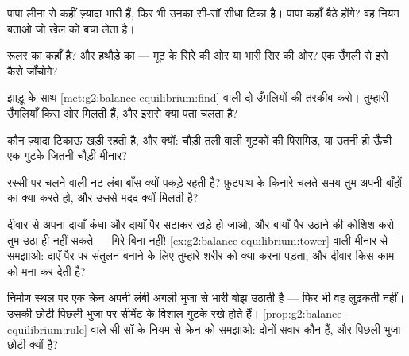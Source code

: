 \begin{exercise}[$\star$]\label{exo:g2:balance-equilibrium:4}
पापा लीना से कहीं ज़्यादा भारी हैं, फिर भी उनका सी-सॉ सीधा टिका है।
पापा कहाँ बैठे होंगे? वह नियम बताओ जो खेल को बचा लेता है।
\end{exercise}

\begin{exercise}[$\star$]\label{exo:g2:balance-equilibrium:5}
रूलर का  कहाँ है? और हथौड़े का --- मूठ के सिरे की ओर या
भारी सिर की ओर? एक उँगली से इसे कैसे जाँचोगे?
\end{exercise}

\begin{exercise}[$\star$]\label{exo:g2:balance-equilibrium:6}
झाड़ू के साथ \cref{met:g2:balance-equilibrium:find} वाली दो उँगलियों
की तरकीब करो। तुम्हारी उँगलियाँ किस ओर मिलती हैं, और इससे क्या पता
चलता है?
\end{exercise}

\begin{exercise}[$\star$]\label{exo:g2:balance-equilibrium:7}
कौन ज़्यादा टिकाऊ खड़ी रहती है, और क्यों: चौड़ी तली वाली गुटकों की
पिरामिड, या उतनी ही ऊँची एक गुटके जितनी चौड़ी मीनार?
\end{exercise}

\begin{exercise}[$\star$]\label{exo:g2:balance-equilibrium:8}
रस्सी पर चलने वाली नट लंबा बाँस क्यों पकड़े रहती है? फ़ुटपाथ के
किनारे चलते समय तुम अपनी बाँहों का क्या करते हो, और उससे मदद क्यों
मिलती है?
\end{exercise}

\begin{exercise}[$\star$]\label{exo:g2:balance-equilibrium:9}
दीवार से अपना दायाँ कंधा और दायाँ पैर सटाकर खड़े हो जाओ, और बायाँ
पैर उठाने की कोशिश करो। तुम उठा ही नहीं सकते --- गिरे बिना नहीं!
\cref{ex:g2:balance-equilibrium:tower} वाली मीनार से समझाओ: दाएँ पैर
पर संतुलन बनाने के लिए तुम्हारे शरीर को क्या करना पड़ता, और दीवार
किस काम को मना कर देती है?
\end{exercise}

\begin{exercise}[$\star\star$]\label{exo:g2:balance-equilibrium:10}
निर्माण स्थल पर एक क्रेन अपनी लंबी अगली भुजा से भारी बोझ उठाती है ---
फिर भी वह लुढ़कती नहीं। उसकी छोटी पिछली भुजा पर सीमेंट के विशाल गुटके
रखे होते हैं। \cref{prop:g2:balance-equilibrium:rule} वाले सी-सॉ के
नियम से क्रेन को समझाओ: दोनों सवार कौन हैं, और पिछली भुजा छोटी क्यों
है?
\end{exercise}
